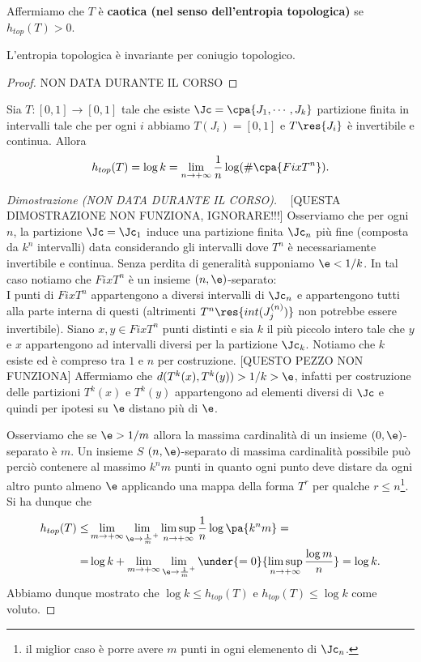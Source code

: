 \begin{definition}
Affermiamo che $T$ \`e \textbf{caotica (nel senso dell'entropia topologica)} se $h_{top}(T)>0$.
\end{definition}

\begin{proposition}\label{EntropiaTopologicaInvariantePerConiugioTopologico}
L'entropia topologica \`e invariante per coniugio topologico.
\end{proposition}
\begin{proof}
NON DATA DURANTE IL CORSO
\end{proof}

\begin{proposition}\label{EntropiaTopologicaEPartizioni}
Sia $T:[0,1]\to[0,1]$ tale che esiste $\Jc=\cpa{J_1,\cdots, J_k}$ partizione finita in intervalli tale che per ogni $i$ abbiamo $T(J_i)=[0,1]$ e $T\res{J_i}$ \`e invertibile e continua. Allora 
\[h_{top}(T)=\log k=\lim_{n\to+\infty}\frac1n\log(\#\cpa{Fix T^n}).\]
\end{proposition}
\begin{proof}[Dimostrazione (NON DATA DURANTE IL CORSO)]
	~
[QUESTA DIMOSTRAZIONE NON FUNZIONA, IGNORARE!!!]
Osserviamo che per ogni $n$, la partizione $\Jc=\Jc_1$ induce una partizione finita $\Jc_n$ pi\`u fine (composta da $k^n$ intervalli) data considerando gli intervalli dove $T^n$ \`e necessariamente invertibile e continua.
Senza perdita di generalit\`a supponiamo $\e<1/k$. In tal caso notiamo che $Fix T^n$ \`e un insieme $(n,\e)$-separato:\\
I punti di $Fix T^n$ appartengono a diversi intervalli di $\Jc_n$ e appartengono tutti alla parte interna di questi (altrimenti $T^n\res{int(J^{(n)}_j)}$ non potrebbe essere invertibile). Siano $x,y\in Fix T^n$ punti distinti e sia $k$ il pi\`u piccolo intero tale che $y$ e $x$ appartengono ad intervalli diversi per la partizione $\Jc_k$. Notiamo che $k$ esiste ed \`e compreso tra $1$ e $n$ per costruzione. [QUESTO PEZZO NON FUNZIONA] Affermiamo che $d(T^k(x),T^k(y))>1/k>\e$, infatti per costruzione delle partizioni $T^k(x)$ e $T^k(y)$ appartengono ad elementi diversi di $\Jc$ e quindi per ipotesi su $\e$ distano pi\`u di $\e$.

Osserviamo che se $\e>1/m$ allora la massima cardinalit\`a di un insieme $(0,\e)$-separato \`e $m$. Un insieme $S$ $(n,\e)$-separato di massima cardinalit\`a possibile pu\`o perci\`o contenere al massimo $k^nm$ punti in quanto ogni punto deve distare da ogni altro punto almeno $\e$ applicando una mappa della forma $T^r$ per qualche $r\leq n$\footnote{il miglior caso \`e porre avere $m$ punti in ogni elemenento di $\Jc_n$.}. Si ha dunque che 
\begin{align*}
h_{top}(T)\leq&\lim_{m\to+\infty}\lim_{\e\to\frac1m^+}\limsup_{n\to+\infty}\frac1n\log\pa{k^nm}=\\
=&\log k +\lim_{m\to+\infty}\lim_{\e\to\frac1m^+}\under{=0}{\limsup_{n\to+\infty}\frac{\log m}n}=\log k.
\end{align*}
Abbiamo dunque mostrato che $\log k\leq h_{top}(T)$ e $h_{top}(T)\leq \log k$ come voluto.
\end{proof}

